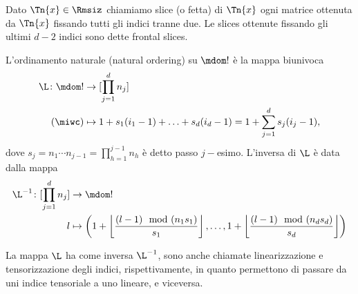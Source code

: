 \begin{definition}
  Dato $ \Tn{x} \in \Rmsiz $ chiamiamo slice (o fetta) di $ \Tn{x} $ ogni matrice ottenuta da $
  \Tn{x} $ fissando tutti gli indici tranne due. Le slices ottenute fissando gli ultimi $ d-2 $ indici sono dette frontal slices.
\end{definition}

\begin{definition}
  L'ordinamento naturale (natural ordering) su $ \mdom! $ è la mappa biunivoca
\begin{equation*}
  \begin{aligned}
    \L \colon \mdom! &\to [\prod_{j=1}^d n_j]\\
    (\miwc) &\mapsto 1 + s_1 (i_1-1) + \ldots + s_d(i_d-1) = 1 + \sum_{j=1}^d s_j(i_j - 1),
  \end{aligned}
\end{equation*}
dove $ s_j = n_1 \cdots n_{j-1} = \prod_{h=1}^{j-1}n_h $ è detto passo $ j- $esimo.
L'inversa di $ \L $ è data dalla mappa
\begin{equation*}
  \begin{aligned}
    \L^{-1} \colon [\prod_{j=1}^d n_j] &\to \mdom!\\
    l &\mapsto \left(1 + \left\lfloor \frac{ (l-1)\mod(n_1s_1)}{s_1}\right\rfloor, \ldots, 1 +
    \left\lfloor \frac{ (l-1)\mod(n_ds_d)}{s_d} \right\rfloor \right)
  \end{aligned}
\end{equation*}
\end{definition}
\begin{remark}
  La mappa $ \L $ ha come inversa $ \L^{-1} $, sono anche chiamate linearizzazione e tensorizzazione
  degli indici, rispettivamente, in quanto permettono di passare da uni indice tensoriale a uno
  lineare, e viceversa.
\end{remark}
